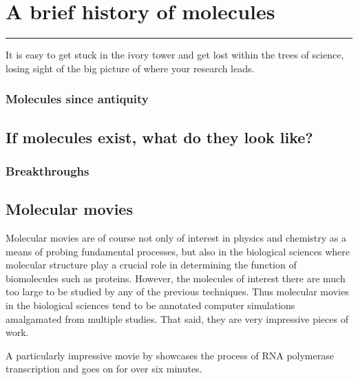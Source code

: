 \chapter{A brief history of molecules}\label{ch:history}

\vspace{-1.5 em}
\minitoc\hrule
\vspace{1.5 em}

It is easy to get stuck in the ivory tower and get lost within the trees of science, losing sight of the big picture of where your research leads.

\subsection{Molecules since antiquity}

\section{If molecules exist, what do they look like?}
\subsection{Breakthroughs}

\section{Molecular movies}
Molecular movies are of course not only of interest in physics and chemistry as a means of probing fundamental processes, but also in the biological sciences where molecular structure play a crucial role in determining the function of biomolecules such as proteins. However, the molecules of interest there are much too large to be studied by any of the previous techniques. Thus molecular movies in the biological sciences tend to be annotated computer simulations amalgamated from multiple studies. That said, they are very impressive pieces of work.

A particularly impressive movie by \citet{Cheung12} showcases the process of RNA polymerase transcription and goes on for over six minutes.

